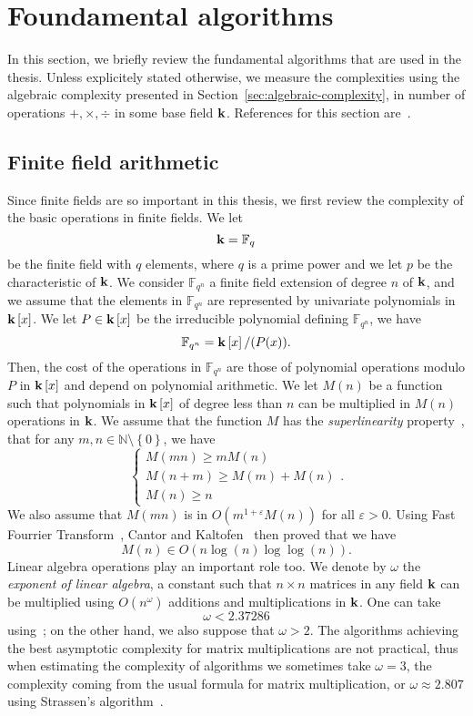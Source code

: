 \section{Foundamental algorithms}
\label{sec:foundamental-algos}

In this section, we briefly review the fundamental algorithms that are used in
the thesis. Unless explicitely stated otherwise, we measure the complexities
using the algebraic complexity presented in
Section~\ref{sec:algebraic-complexity}, \ie in number of operations $+, \times,
\div$ in some base field $\mathbf{k}$. References for this section are~\cite{GG13,
BCGLLSS17, BDDFS17}.

\subsection{Finite field arithmetic}

Since finite fields are so important in this thesis, we first review the
complexity of the basic operations in finite fields. We let
\[
  \mathbf{k} = \mathbb{F}_q
\]
be the finite field with $q$ elements, where $q$ is a prime power and we let $p$
be the characteristic of $\mathbf{k}$. We consider $\mathbb{F}_{q^n}$ a finite field
extension of degree $n$ of $\mathbf{k}$, and we assume that the elements in
$\mathbb{F}_{q^n}$ are represented by univariate polynomials in $\mathbf{k}\left[ x
\right]$. We let $P\in\mathbf{k}\left[ x \right]$ be the irreducible polynomial
defining $\mathbb{F}_{q^n}$, \ie we have
\[
  \mathbb{F}_{q^n} = \mathbf{k}\left[ x \right]/(P(x)).
\]
Then, the cost of the operations in $\mathbb{F}_{q^n}$ are those of polynomial
operations modulo $P$ in $\mathbf{k}\left[ x \right]$ and depend on polynomial
arithmetic. We let $M(n)$ be a function such that polynomials in $\mathbf{k}\left[ x
\right]$ of degree less than $n$ can be multiplied in $M(n)$ operations in $\mathbf{k}$.
We assume that the function $M$ has the \emph{superlinearity}
property~\cite[Chapter 8.3]{GG13}, \ie that for any $m,
n\in\mathbb{N}\setminus\left\{ 0 \right\}$, we have
\[
  \left\{
  \begin{array}{l}
    M(mn) \geq mM(n) \\
    M(n+m)\geq M(m) + M(n) \\
    M(n) \geq n
  \end{array}
  \right.
.\]
We also assume that $M(mn)$ is in $O(m^{1+\varepsilon}M(n))$ for all
$\varepsilon>0$. Using Fast Fourrier Transform~\cite{CT65, SS71}, Cantor and
Kaltofen~\cite{CK91} then proved that we have
\[
  M(n)\in O(n\log(n)\log\log(n)).
\]
Linear algebra operations play an important role too. We denote by $\omega$ the
\emph{exponent of linear algebra}, \ie a constant such that $n\times n$ matrices
in any field $\mathbf{k}$ can be multiplied using $O(n^\omega)$ additions and
multiplications in $\mathbf{k}$. One can take
\[
  \omega < 2.37286
\]
using~\cite{AW21}; on the other hand, we also suppose that $\omega >2$. The
algorithms achieving the best asymptotic complexity for matrix multiplications
are not practical, thus when estimating the complexity of algorithms we
sometimes take $\omega=3$, the complexity coming from the usual formula for
matrix multiplication, or $\omega\approx 2.807$ using Strassen's
algorithm~\cite{Strassen69}.

